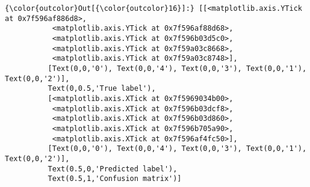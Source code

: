 \documentclass[11pt]{article}
\begin{document}
\begin{Verbatim}[commandchars=\\\{\}]
{\color{outcolor}Out[{\color{outcolor}16}]:} [[<matplotlib.axis.YTick at 0x7f596af886d8>,
           <matplotlib.axis.YTick at 0x7f596af88d68>,
           <matplotlib.axis.YTick at 0x7f596b03d5c0>,
           <matplotlib.axis.YTick at 0x7f59a03c8668>,
           <matplotlib.axis.YTick at 0x7f59a03c8748>],
          [Text(0,0,'0'), Text(0,0,'4'), Text(0,0,'3'), Text(0,0,'1'), Text(0,0,'2')],
          Text(0,0.5,'True label'),
          [<matplotlib.axis.XTick at 0x7f5969034b00>,
           <matplotlib.axis.XTick at 0x7f596b03dcf8>,
           <matplotlib.axis.XTick at 0x7f596b03d860>,
           <matplotlib.axis.XTick at 0x7f596b705a90>,
           <matplotlib.axis.XTick at 0x7f596af4fc50>],
          [Text(0,0,'0'), Text(0,0,'4'), Text(0,0,'3'), Text(0,0,'1'), Text(0,0,'2')],
          Text(0.5,0,'Predicted label'),
          Text(0.5,1,'Confusion matrix')]
\end{Verbatim}
            
    \begin{center}
    \end{center}
    { \hspace*{\fill} \\}
    
\end{document}
